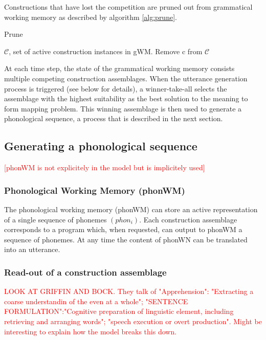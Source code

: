 \documentclass{article}
\newcommand\todo[1]{\textcolor{red}{#1}}
\begin{document}
Constructions that have lost the competition are pruned out from grammatical working memory as described by algorithm \ref{alg:prune}.

\begin{algorithm}[H]
\caption{Prune}
\label{alg:prune}
\begin{algorithmic}
	\REQUIRE $\mathcal{C}$, set of active construction instances in gWM.
			\STATE Remove c from $\mathcal{C}$ 
		\ENDIF
	\ENDFOR
\end{algorithmic}
\end{algorithm}

At each time step, the state of the grammatical working memory consists multiple competing construction assemblages. When the utterance generation process is triggered (see below for details), a winner-take-all selects the assemblage with the highest suitability as the best solution to the meaning to form mapping problem. This winning assemblage is then used to generate a phonological sequence, a process that is described in the next section.

\subsection{Generating a phonological sequence}
\todo{[phonWM is not explicitely in the model but is implicitely used]}

\subsubsection{Phonological Working Memory (phonWM)}

The phonological working memory (phonWM) can store an active representation of a single sequence of phonemes $(phon_i)$. Each construction assemblage corresponds to a program which, when requested, can output to phonWM a sequence of phonemes. At any time the content of phonWN can be translated into an utterance.

\subsubsection{Read-out of a construction assemblage}

\todo{LOOK AT GRIFFIN AND BOCK. They talk of "Apprehension": "Extracting a coarse understandin of the even at a whole"; "SENTENCE FORMULATION":"Cognitive preparation of linguistic element, including retrieving and arranging words"; "speech execution or overt production". Might be interesting to explain how the model breaks this down.}
\end{document}
